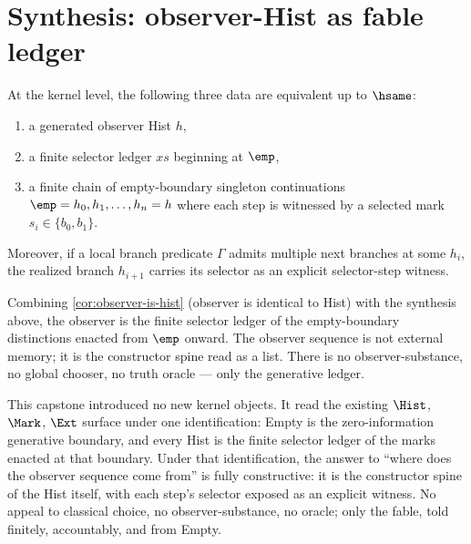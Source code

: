 \section{Synthesis: observer-Hist as fable ledger}
\label{sec:efm-synthesis}

\begin{theorem}
\label{thm:efm-synthesis}
At the kernel level, the following three data are equivalent up to $\hsame$:
\begin{enumerate}
  \item a generated observer Hist $h$,
  \item a finite selector ledger $xs$ beginning at $\emp$,
  \item a finite chain of empty-boundary singleton continuations $\emp = h_0, h_1, \dots, h_n = h$ where each step is witnessed by a selected mark $s_i \in \{b_0, b_1\}$.
\end{enumerate}
Moreover, if a local branch predicate $\Gamma$ admits multiple next branches at some $h_i$, the realized branch $h_{i+1}$ carries its selector as an explicit selector-step witness.
\end{theorem}

\begin{corollary}
\label{cor:efm-observer-as-ledger}
Combining \autoref{cor:observer-is-hist} (observer is identical to Hist) with the synthesis above, the observer is the finite selector ledger of the empty-boundary distinctions enacted from $\emp$ onward. The observer sequence is not external memory; it is the constructor spine read as a list. There is no observer-substance, no global chooser, no truth oracle — only the generative ledger.
\end{corollary}

\begin{remark}
\label{rem:efm-closing}
This capstone introduced no new kernel objects. It read the existing $\Hist$, $\Mark$, $\Ext$ surface under one identification: Empty is the zero-information generative boundary, and every Hist is the finite selector ledger of the marks enacted at that boundary. Under that identification, the answer to ``where does the observer sequence come from'' is fully constructive: it is the constructor spine of the Hist itself, with each step's selector exposed as an explicit witness. No appeal to classical choice, no observer-substance, no oracle; only the fable, told finitely, accountably, and from Empty.
\end{remark}

